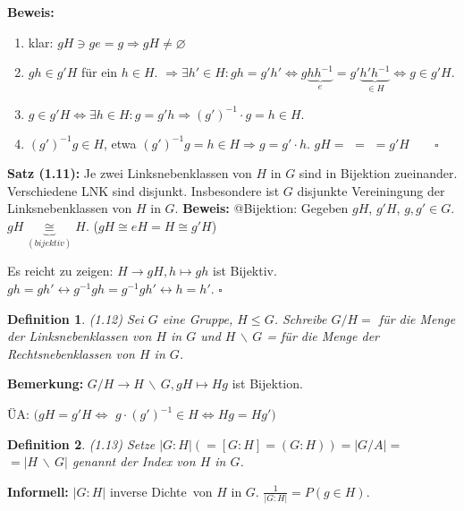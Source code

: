 \documentclass[10pt,a4paper]{article}
\newtheorem{defi}{Definition}
\begin{document}
\textbf{Beweis:}
\begin{enumerate}
\item klar: $gH \ni ge = g \Rightarrow gH \neq \varnothing$
\item $gh \in g'H$ für ein $h \in H$. $\Rightarrow \exists h' \in H: gh = g' h' \Leftrightarrow g \underbrace{h h^{-1}}_{e} = g'\underbrace{h'h^{-1}}_{\in H} \Leftrightarrow g \in g'H$.
\item $g \in g'H \Leftrightarrow \exists h \in H: g = g'h \Rightarrow (g')^{-1} \cdot g = h \in H.$
\item $(g')^{-1} g \in H$, etwa $(g')^{-1}g = h \in H \Rightarrow g = g' \cdot h$. $gH = $ $=$  $= g'H\qquad\square$
\end{enumerate}

\textbf{Satz (1.11):} Je zwei Linksnebenklassen von $H$ in $G$ sind in Bijektion zueinander. Verschiedene LNK sind disjunkt. Insbesondere ist $G$ disjunkte Vereiningung der Linksnebenklassen von $H$ in $G$.
\textbf{Beweis:} @Bijektion: Gegeben $gH$, $g'H$, $g, g' \in G$. \\
$gH \underbrace{\cong}_{(bijektiv)} H$. ($gH \cong eH = H \cong g'H$)

Es reicht zu zeigen: $H \to gH, h \mapsto gh$ ist Bijektiv. $gh = gh' \leftrightarrow g^{-1}gh = g^{-1}gh' \leftrightarrow h = h'$. $\square$

\begin{defi} (1.12)
Sei $G$ eine Gruppe, $H \leqslant G$. Schreibe $G / H = $  für die Menge der Linksnebenklassen von $H$ in $G$ und $H \,\backslash\, G$ =  für die Menge der Rechtsnebenklassen von $H$ in $G$.
\end{defi}

\textbf{Bemerkung:} $G / H \to H \,\backslash\, G, gH \mapsto Hg$ ist Bijektion.

ÜA: $(gH = g'H \Leftrightarrow$ %
$g \cdot (g')^{-1} \in H \Leftrightarrow Hg = Hg')$

\begin{defi} (1.13)
Setze $\vert G : H\vert (= [G:H] = (G:H)) = \vert G / A\vert =$ %
$= \vert H \,\backslash\, G\vert$ genannt der \emph{Index} von $H$ in $G$. 
\end{defi}

\textbf{Informell:} $\vert G : H\vert$ \glqq inverse Dichte\grqq\ von $H$ in $G$. $\frac{1}{\vert G : H\vert} = $\glqq $ P(g \in H)$\grqq .
\end{document}
